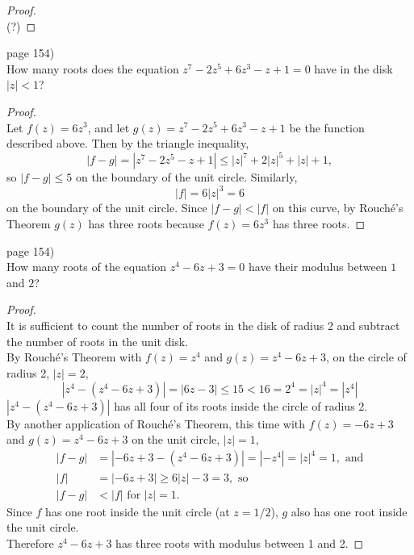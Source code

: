 \documentclass{article}
\newenvironment{problem}[2][Problem]{\begin{trivlist}
\item[\hskip \labelsep {\bfseries #1}\hskip \labelsep {\bfseries #2.}]}{\end{trivlist}}
\begin{document}
\begin{proof} \text{} \\
  (?)
\end{proof}
\pagebreak

\begin{problem}{1} (page 154) \\
  How many roots does the equation $z^7 - 2z^5 + 6z^3 - z + 1 = 0$ have in the
  disk $|z| < 1$?
\end{problem}

\begin{proof} \text{} \\
  Let $f(z) = 6z^3$, and let $g(z) = z^7 - 2z^5 + 6z^3 - z + 1$ be the function
  described above. Then by the triangle inequality, \[
    |f-g| = |z^7 - 2z^5 - z + 1| \leq |z|^7 + 2|z|^5 + |z| + 1,
  \] so $|f-g| \leq 5$ on the boundary of the unit circle. Similarly, \[
    |f| = 6|z|^3 = 6
  \] on the boundary of the unit circle.
  Since $|f-g| < |f|$ on this curve, by Rouch\'e's Theorem $g(z)$ has three roots
  because $f(z) = 6z^3$ has three roots.

\end{proof}
\pagebreak

\begin{problem}{2} (page 154) \\
  How many roots of the equation $z^4 - 6z + 3 = 0$ have their modulus between
  $1$ and $2$?
\end{problem}

\begin{proof} \text{} \\
  It is sufficient to count the number of roots in the disk of radius 2 and
  subtract the number of roots in the unit disk.\\
  By Rouch\'e's Theorem with $f(z) = z^4$ and $g(z) = z^4 - 6z + 3$, on the circle
  of radius 2, $|z| = 2$, \[
    |z^4 - (z^4 - 6z + 3)| = |6z - 3| \leq 15 < 16 = 2^4 = |z|^4 = |z^4|
  \] $|z^4 - (z^4 - 6z + 3)|$ has all four of its roots inside the circle of
  radius 2.\\
  By another application of Rouch\'e's Theorem, this time with
  $f(z) = -6z+3$ and $g(z) = z^4 - 6z + 3$ on the unit circle, $|z| = 1$, \begin{align*}
    |f-g| &= |-6z + 3 - (z^4 - 6z + 3)| = |-z^4| = |z|^4 = 1, \text{ and}\\
    |f| &= |-6z + 3| \geq 6|z| - 3 = 3, \text{ so}\\
    |f-g| &< |f| \text{ for } |z| = 1.
  \end{align*} Since $f$ has one root inside the unit circle (at $z = 1/2$), $g$
  also has one root inside the unit circle.
  \\ Therefore $z^4 - 6z + 3$ has three roots with modulus between 1 and 2.
\end{proof}
\pagebreak
\end{document}
